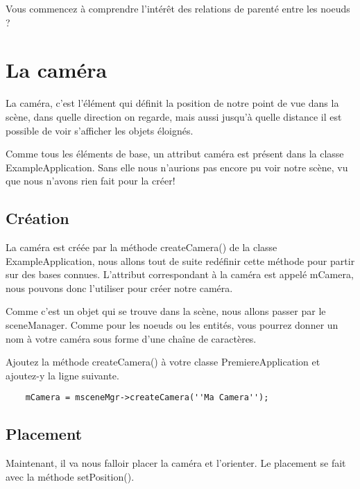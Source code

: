 \documentclass[10pt,a4paper]{report}
\begin{document}
Vous commencez \`{a} comprendre l'int\'er\^et des relations de parent\'e entre les noeuds ?









\section{La cam\'era}


La cam\'era, c'est l'\'el\'ement qui d\'efinit la position de notre point de vue dans la sc\`ene, dans quelle direction on regarde, mais aussi jusqu'\`{a} quelle distance il est possible de voir s'afficher les objets \'eloign\'es.

Comme tous les \'el\'ements de base, un attribut cam\'era est pr\'esent dans la classe ExampleApplication. Sans elle nous n'aurions pas encore pu voir notre sc\`ene, vu que nous n'avons rien fait pour la cr\'eer!



\subsection{Cr\'eation}

La cam\'era est cr\'e\'ee par la m\'ethode  createCamera() de la classe ExampleApplication, nous allons tout de suite red\'efinir cette m\'ethode pour partir sur des bases connues. L'attribut correspondant \`{a} la cam\'era est appel\'e mCamera, nous pouvons donc l'utiliser pour cr\'eer notre cam\'era.

Comme c'est un objet qui se trouve dans la sc\`ene, nous allons passer par le sceneManager. Comme pour les noeuds ou les entit\'es, vous pourrez donner un nom \`{a} votre cam\'era sous forme d'une cha\^ine de caract\`eres.

Ajoutez la m\'ethode createCamera() \`{a} votre classe PremiereApplication et ajoutez-y la ligne suivante.

\begin{lstlisting}
	mCamera = msceneMgr->createCamera(''Ma Camera'');
\end{lstlisting}





\subsection{Placement}

Maintenant, il va nous falloir placer la cam\'era et l'orienter. Le placement se fait avec la m\'ethode setPosition(). 
\end{document}
